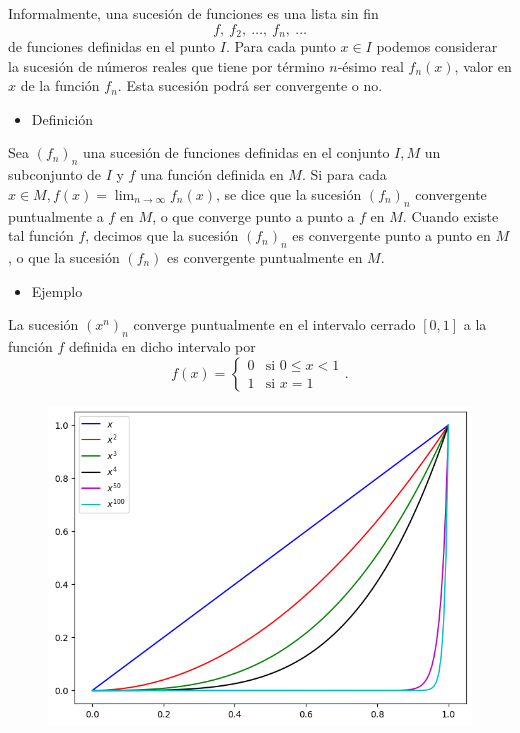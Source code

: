 Informalmente, una sucesión de funciones es una lista sin fin \[ f ,~f_2,~\hdots,~f_n,~\hdots \] de funciones definidas en el punto $I$. Para cada punto $x\in I$ podemos considerar la sucesión de números reales que tiene por término $n$-ésimo real $f_n(x)$, valor en $x$ de la función $f_n$. Esta sucesión podrá ser convergente o no.
\begin{itemize}[label=\color{red}\textbullet, leftmargin=*]
	\item \color{lightblue}Definición
\end{itemize}
Sea $(f_n)_n$ una sucesión de funciones definidas en el conjunto $I,M$ un subconjunto de $I$ y $f$ una función definida en $M$. Si para cada $x\in M,f(x)=\lim_{n\to\infty}f_n(x)$, se dice que la sucesión $(f_n)_n$ convergente puntualmente a $f$ en $M$, o que converge punto a punto a $f$ en $M$. Cuando existe tal función $f$, decimos que la sucesión $(f_n)_n$ es convergente punto a punto en $M$, o que la sucesión $(f_n)$ es convergente puntualmente en $M$.
\begin{itemize}[label=\color{red}\textbullet, leftmargin=*]
	\item \color{lightblue}Ejemplo
\end{itemize}
La sucesión $(x^n)_n$ converge puntualmente en el intervalo cerrado $ [0,1]$ a la función $f$ definida en dicho intervalo por \[ f(x)=\left\{\begin{array}{ll}
	0 & \text{si }0\le x <1\\
	1 & \text{si }x=1
\end{array}\right. . \]

\begin{figure}
	\centering
	\includegraphics{"Temas/Tema 4/Gráfica 1.png"}
\end{figure}


